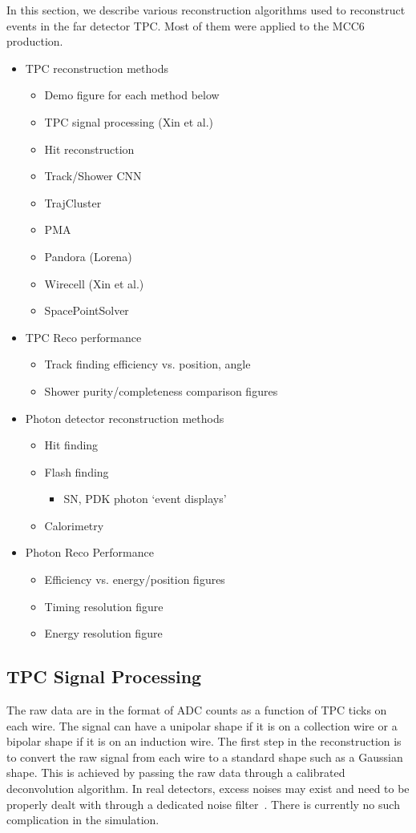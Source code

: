 In this section, we describe various reconstruction algorithms used to reconstruct events in the far detector TPC. Most of them were applied to the MCC6 production.

\begin{itemize}
\item TPC reconstruction methods
\begin{itemize}
\item Demo figure for each method below
\item TPC signal processing (Xin et al.)
\item Hit reconstruction
\item Track/Shower CNN
\item TrajCluster
\item PMA
\item Pandora (Lorena)
\item Wirecell (Xin et al.)
\item SpacePointSolver
\end{itemize}
\item TPC Reco performance
\begin{itemize} 
\item Track finding efficiency vs. position, angle
\item Shower purity/completeness comparison figures 
\end{itemize}
\item Photon detector reconstruction methods
\begin{itemize}
\item Hit finding
\item Flash finding
\begin{itemize} \item SN, PDK photon `event displays' \end{itemize}
\item Calorimetry
\end{itemize}
\item Photon Reco Performance
\begin{itemize}
\item Efficiency vs. energy/position figures
\item Timing resolution figure
\item Energy resolution figure
\end{itemize}
\end{itemize}

\subsection{TPC Signal Processing}
The raw data are in the format of ADC counts as a function of TPC ticks on each wire. The signal can have a unipolar shape if it is on a collection wire or a bipolar shape if it is on an induction wire. The first step in the reconstruction is to convert the raw signal from each wire to a standard shape such as a Gaussian shape. This is achieved by passing the raw data through a calibrated deconvolution algorithm. In real detectors, excess noises may exist and need to be properly dealt with through a dedicated noise filter~\cite{Acciarri:2017sde}. There is currently no such complication in the simulation.


